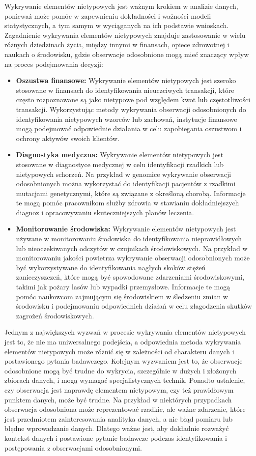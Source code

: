 \documentclass[12pt,a4paper,oneside]{book}
\theoremstyle{definition}
\begin{document}
Wykrywanie elementów nietypowych jest ważnym krokiem w analizie danych, ponieważ może pomóc w zapewnieniu dokładności i ważności modeli statystycznych, a tym samym w wyciąganych na ich podstawie wnioskach. Zagadnienie wykrywania elementów nietypowych znajduje zastosowanie w wielu różnych dziedzinach życia, między innymi w finansach, opiece zdrowotnej i naukach o środowisku, gdzie obserwacje odosobnione mogą mieć znaczący wpływ na proces podejmowania decyzji:
\begin{itemize}
\item \textbf{Oszustwa finansowe:} Wykrywanie elementów nietypowych jest szeroko stosowane w finansach do identyfikowania nieuczciwych transakcji, które często rozpoznawane są jako nietypowe pod względem kwot lub częstotliwości transakcji. Wykorzystując metody wykrywania obserwacji odosobnionych do identyfikowania nietypowych wzorców lub zachowań, instytucje finansowe mogą podejmować odpowiednie działania w celu zapobiegania oszustwom i ochrony aktywów swoich klientów.
\item \textbf{Diagnostyka medyczna:} Wykrywanie elementów nietypowych jest stosowane w diagnostyce medycznej w celu identyfikacji rzadkich lub nietypowych schorzeń. Na przykład w genomice wykrywanie obserwacji odosobnionych można wykorzystać do identyfikacji pacjentów z rzadkimi mutacjami genetycznymi, które są związane z określoną chorobą. Informacje te mogą pomóc pracownikom służby zdrowia w stawianiu dokładniejszych diagnoz i opracowywaniu skuteczniejszych planów leczenia.
\item \textbf{Monitorowanie środowiska:} Wykrywanie elementów nietypowych jest używane w monitorowaniu środowiska do identyfikowania nieprawidłowych lub nieoczekiwanych odczytów w czujnikach środowiskowych. Na przykład w monitorowaniu jakości powietrza wykrywanie obserwacji odosobnionych może być wykorzystywane do identyfikowania nagłych skoków stężeń zanieczyszczeń, które mogą być spowodowane zdarzeniami środowiskowymi, takimi jak pożary lasów lub wypadki przemysłowe. Informacje te mogą pomóc naukowcom zajmującym się środowiskiem w śledzeniu zmian w środowisku i podejmowaniu odpowiednich działań w celu złagodzenia skutków zagrożeń środowiskowych.
\end{itemize}

Jednym z największych wyzwań w procesie wykrywania elementów nietypowych jest to, że nie ma uniwersalnego podejścia, a odpowiednia metoda wykrywania elementów nietypowych może różnić się w zależności od charakteru danych i postawionego pytania badawczego. Kolejnym wyzwaniem jest to, że obserwacje odosobnione mogą być trudne do wykrycia, szczególnie w dużych i złożonych zbiorach danych, i mogą wymagać specjalistycznych technik. Ponadto ustalenie, czy obserwacja jest naprawdę elementem nietypowym, czy też prawidłowym punktem danych, może być trudne. Na przykład w niektórych przypadkach obserwacja odosobniona może reprezentować rzadkie, ale ważne zdarzenie, które jest przedmiotem zainteresowania analityka danych, a nie błąd pomiaru lub błędne wprowadzanie danych. Dlatego ważne jest, aby dokładnie rozważyć kontekst danych i postawione pytanie badawcze podczas identyfikowania i postępowania z obserwacjami odosobnionymi.
\end{document}
